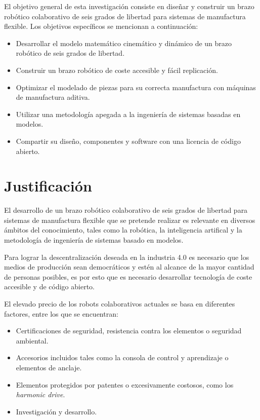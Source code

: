 El objetivo general de esta investigación consiste en diseñar y construir un brazo robótico colaborativo de seis grados de libertad para sistemas de manufactura flexible. Los objetivos específicos se mencionan a continuación:

\begin{itemize}
\item Desarrollar el modelo matemático cinemático y dinámico de un brazo robótico de seis grados de libertad.
\item Construir un brazo robótico de coste accesible y fácil replicación.
\item Optimizar el modelado de piezas para su correcta manufactura con máquinas de manufactura aditiva.
\item Utilizar una metodología apegada a la ingeniería de sistemas basadas en modelos.
\item Compartir su diseño, componentes y software con una licencia de código abierto. 
\end{itemize}

\section{Justificación}

El desarrollo de un brazo robótico colaborativo de seis grados de libertad para sistemas de manufactura flexible que se pretende realizar es relevante en diversos ámbitos del conocimiento, tales como la robótica, la inteligencia artifical y la metodología de ingeniería de sistemas basado en modelos.

Para lograr la descentralización deseada en la industria 4.0 es necesario que los medios de producción sean democráticos y estén al alcance de la mayor cantidad de personas posibles, es por esto que es necesario desarrollar tecnología de coste accesible y de código abierto.

El elevado precio de los robots colaborativos actuales se basa en diferentes factores, entre los que se encuentran:

\begin{itemize}
\item Certificaciones de seguridad, resistencia contra los elementos o seguridad ambiental.
\item Accesorios incluidos tales como la consola de control y aprendizaje o elementos de anclaje.
\item Elementos protegidos por patentes o excesivamente costosos, como los \textit{harmonic drive}.
\item Investigación y desarrollo.
\end{itemize}

